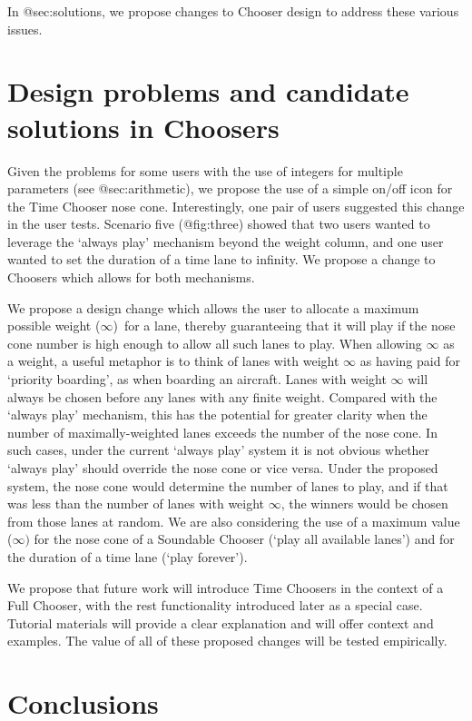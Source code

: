 \documentclass[]{article}
\begin{document}
In @sec:solutions, we propose changes to Chooser design to address these
various issues.

\hypertarget{sec:solutions}{%
\section{Design problems and candidate solutions in
Choosers}\label{sec:solutions}}

Given the problems for some users with the use of integers for multiple
parameters (see @sec:arithmetic), we propose the use of a simple on/off
icon for the Time Chooser nose cone. Interestingly, one pair of users
suggested this change in the user tests. Scenario five (@fig:three)
showed that two users wanted to leverage the `always play' mechanism
beyond the weight column, and one user wanted to set the duration of a
time lane to infinity. We propose a change to Choosers which allows for
both mechanisms.

We propose a design change which allows the user to allocate a maximum
possible weight (\(\infty\))~for a lane, thereby guaranteeing that it
will play if the nose cone number is high enough to allow all such lanes
to play. When allowing \(\infty\) as a weight, a useful metaphor is to
think of lanes with weight \(\infty\) as having paid for `priority
boarding', as when boarding an aircraft. Lanes with weight \(\infty\)
will always be chosen before any lanes with any finite weight. Compared
with the `always play' mechanism, this has the potential for greater
clarity when the number of maximally-weighted lanes exceeds the number
of the nose cone. In such cases, under the current `always play' system
it is not obvious whether `always play' should override the nose cone or
vice versa. Under the proposed system, the nose cone would determine the
number of lanes to play, and if that was less than the number of lanes
with weight \(\infty\), the winners would be chosen from those lanes at
random. We are also considering the use of a maximum value (\(\infty)\)
for the nose cone of a Soundable Chooser (`play all available lanes')
and for the duration of a time lane (`play forever').

We propose that future work will introduce Time Choosers in the context
of a Full Chooser, with the rest functionality introduced later as a
special case. Tutorial materials will provide a clear explanation and
will offer context and examples. The value of all of these proposed
changes will be tested empirically.

\hypertarget{conclusions}{%
\section{Conclusions}\label{conclusions}}
\end{document}

